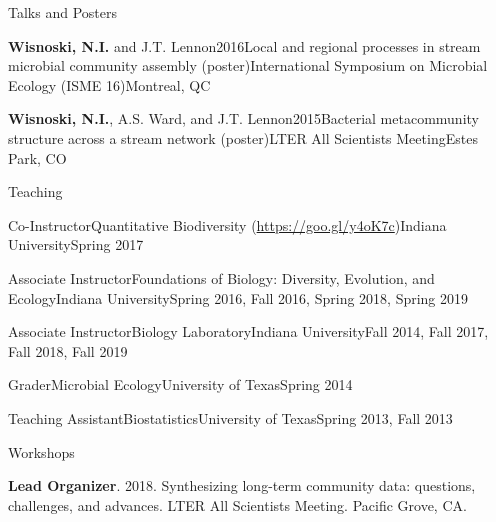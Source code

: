 \documentclass{resume} %
\begin{document}
\begin{rhangSection}{Talks and Posters}
  \begin{Presentation}{{\bf Wisnoski, N.I.} and J.T. Lennon}{2016}{Local and regional processes in stream microbial community assembly (poster)}{International Symposium on Microbial Ecology (ISME 16)}{Montreal, QC}
  \end{Presentation}

  \begin{Presentation}{{\bf Wisnoski, N.I.}, A.S. Ward, and J.T. Lennon}{2015}{Bacterial metacommunity structure across a stream network (poster)}{LTER All Scientists Meeting}{Estes Park, CO}
  \end{Presentation}

\end{rhangSection}

\bigskip

\begin{rSection}{Teaching}

\begin{Course}
  {Co-Instructor}{Quantitative Biodiversity (\url{https://goo.gl/y4oK7c})}{Indiana University}{Spring 2017}
\end{Course}

\begin{Course}
  {Associate Instructor}{Foundations of Biology: Diversity, Evolution, and Ecology}{Indiana University}{Spring 2016, Fall 2016, Spring 2018, Spring 2019}
\end{Course}

\begin{Course}
  {Associate Instructor}{Biology Laboratory}{Indiana University}{Fall 2014, Fall 2017, Fall 2018, Fall 2019}
\end{Course}

\begin{Course}
  {Grader}{Microbial Ecology}{University of Texas}{Spring 2014}
\end{Course}

\begin{Course}
  {Teaching Assistant}{Biostatistics}{University of Texas}{Spring 2013, Fall 2013}
\end{Course}

\end{rSection}

\bigskip


\begin{rSection}{Workshops}

{\bf Lead Organizer}. 2018. Synthesizing long-term community data: questions, challenges, and advances. LTER All Scientists Meeting. Pacific Grove, CA.

\end{rSection}
\bigskip
\end{document}
